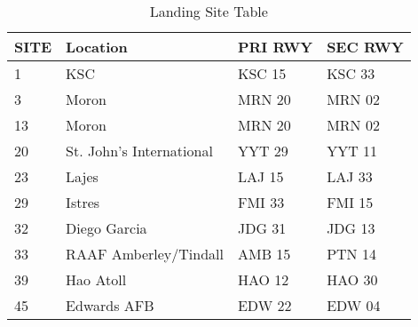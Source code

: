 \documentclass[Space_Shuttle_Ultra_Manual.tex]{subfiles}
\begin{document}
\begin{multicols*}{2}
\begin{table*}[tb]
  \centering
  \begin{tabular}{l | l l l}
    \textbf{SITE} & \textbf{Location} & \textbf{PRI RWY} & \textbf{SEC RWY} \\
    \hline
    1 & KSC & KSC 15 & KSC 33 \\
    3 & Moron & MRN 20 & MRN 02 \\
    13 & Moron & MRN 20 & MRN 02 \\
    20 & St. John's International & YYT 29 & YYT 11 \\
    23 & Lajes & LAJ 15 & LAJ 33 \\
    29 & Istres & FMI 33 & FMI 15 \\
    32 & Diego Garcia & JDG 31 & JDG 13 \\
    33 & RAAF Amberley/Tindall & AMB 15 & PTN 14 \\
    39 & Hao Atoll & HAO 12 & HAO 30 \\
    45 & Edwards AFB & EDW 22 & EDW 04
  \end{tabular}
  \caption{Landing Site Table}
  \label{tab:LandingSites}
\end{table*}
\end{multicols*}
\end{document}
